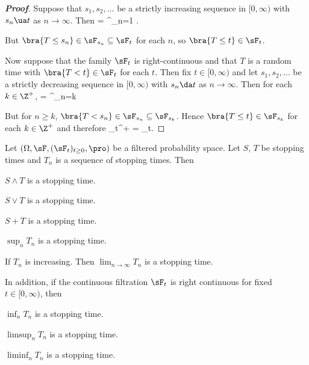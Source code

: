 \begin{proof}[\bf Proof]
Suppose that $s_1,s_2,\dots$ be a strictly increasing sequence in $[0,\infty)$ with $s_n\ua t$ as $n\to\infty$. Then
\be
{} = \bigcup^\infty_{n=1} .
\ee

But $\bra{T\leq s_n} \in \sF_{s_n} \subseteq \sF_t$ for each $n$, so $\bra{T\leq t} \in \sF_t$.

Now suppose that the family $\sF_t$ is right-continuous and that $T$ is a random time with $\bra{T<t}\in \sF_t$ for each $t$. Then fix $t\in [0,\infty)$ and let $s_1,s_2,\dots$ be a strictly decreasing sequence in $[0,\infty)$ with $s_n\da t$ as $n\to \infty$. Then for each $k\in \Z^+$,
\be
{} = \bigcap^\infty_{n=k} 
\ee

But for $n\geq k$, $\bra{T<s_n} \in \sF_{s_n} \subseteq \sF_{s_k}$. Hence $\bra{T\leq t} \in \sF_{s_k}$ for each $k\in \Z^+$ and therefore
\be
{} \in \sF_{t^+} = \sF_t.
\ee
\end{proof}


\begin{proposition}\label{pro:stopping_time_property_continuous}
Let $(\Omega,\sF, (\sF_t)_{t\geq 0},\pro)$ be a filtered probability space. Let $S$, $T$ be stopping times and $T_n$ is a sequence of stopping times. Then
\ben
\item [(i)] $S \land T$ is a stopping time.
\item [(ii)] $S\lor T$ is a stopping time.
\item [(iii)] $S+T$ is a stopping time.
\item [(iv)] $\sup_n T_n$ is a stopping time.
\item [(v)] If $T_n$ is increasing. Then $\lim_{n\to \infty}T_n$ is a stopping time.
\een

In addition, if the continuous filtration $\sF_t$ is right continuous for fixed $t\in [0,\infty)$, then
\ben
\item [(vi)] $\inf_n T_n$ is a stopping time.
\item [(vii)] $\limsup_n T_n$ is a stopping time.
\item [(viii)] $\liminf_n T_n$ is a stopping time.
\een
\end{proposition}


